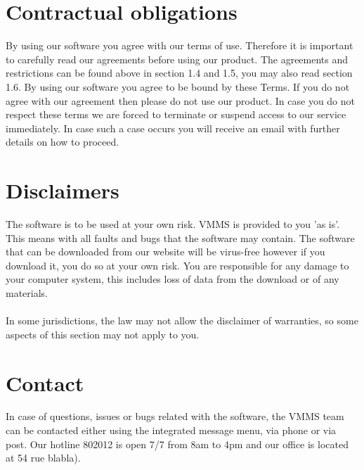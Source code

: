 \section{Contractual obligations}

By using our software you agree with our terms of use. Therefore it is important
to carefully read our agreements before using our product. The agreements and
restrictions can be found above in section 1.4 and 1.5, you may also read
section 1.6. By using our software you agree to be bound by these Terms. If you
do not agree with our agreement then  please do not use our product. In case you
do not respect these terms we are forced to terminate or suspend access to our 
service immediately. In case such a case occurs you will receive an email with 
further details on how to proceed.



\section{Disclaimers}
The software is to be used at your own risk. VMMS is provided to you 'as is'.
This means with all faults and bugs that the software may contain. The software
that can be downloaded from our website will be virus-free however if you
download it, you do so at your own risk. You are responsible for any damage to
your computer system, this includes loss of data from the download or of any 
materials.\\\\In some jurisdictions, the law may not allow the disclaimer of
warranties, so some aspects of this section may not apply to you.


\section{Contact}
In case of questions, issues or bugs related with the software, the VMMS team
can be contacted either using the integrated message menu, via phone or
via post. Our hotline 802012 is open 7/7 from 8am to 4pm and our office is
located at 54 rue blabla).

